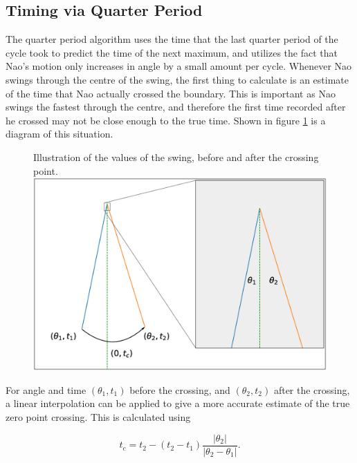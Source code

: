 \documentclass[11pt]{article}
\newcommand*\ruleline[1]{\par\noindent\raisebox{.8ex}{\makebox[\linewidth]{\hrulefill\hspace{1ex}\raisebox{-.8ex}{#1}\hspace{1ex}\hrulefill}}}
\begin{document}
\subsection{Timing via Quarter Period}
\ruleline{George Sheppard}
The quarter period algorithm uses the time that the last quarter period of the cycle took to predict the time of the next maximum, and utilizes the fact that Nao's motion only increases in angle by a small amount per cycle. Whenever Nao swings through the centre of the swing, the first thing to calculate is an estimate of the time that Nao actually crossed the boundary. This is important as Nao swings the fastest through the centre, and therefore the first time recorded after he crossed may not be close enough to the true time. Shown in figure \ref{fig:InterpolationDiagram} is a diagram of this situation. 

    \begin{figure}[!htb]
        \centering
        \captionbox
             {Illustration of the values of the swing, before and after the crossing point.\label{fig:InterpolationDiagram}}
             {\includegraphics[width=1.0\textwidth]{InterpolationDiagram.eps}}
    \end{figure}

For angle and time $(\theta_1, t_1)$ before the crossing, and $(\theta_2, t_2)$ after the crossing, a linear interpolation can be applied to give a more accurate estimate of the true zero point crossing. This is calculated using

\begin{equation}
    t_c = t_2 - (t_2 - t_1) \frac{|\theta_2|}{|\theta_2 - \theta_1|}.
\end{equation}
\end{document}
